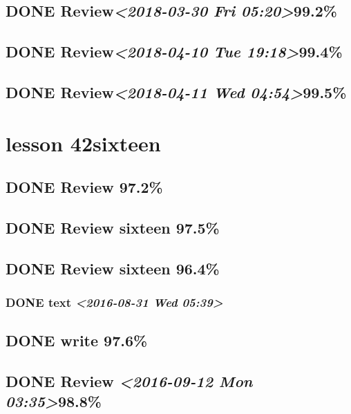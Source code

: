 \documentclass[11pt]{ctexart}
\begin{document}
\subsection{{\bfseries\sffamily DONE} Review\textit{<2018-03-30 Fri 05:20>}99.2\%}
\label{sec:org216b4f2}
\subsection{{\bfseries\sffamily DONE} Review\textit{<2018-04-10 Tue 19:18>}99.4\%}
\label{sec:org41d7b25}
\subsection{{\bfseries\sffamily DONE} Review\textit{<2018-04-11 Wed 04:54>}99.5\%}
\label{sec:orgc7917c3}
\section{lesson 42sixteen}
\label{sec:org973a858}
\subsection{{\bfseries\sffamily DONE} Review 97.2\%}
\label{sec:org3c01923}



\subsection{{\bfseries\sffamily DONE} Review sixteen 97.5\%}
\label{sec:org36be7a0}
\subsection{{\bfseries\sffamily DONE} Review sixteen 96.4\%}
\label{sec:orga836210}
\subsubsection{{\bfseries\sffamily DONE} text \textit{<2016-08-31 Wed 05:39>}}
\label{sec:org6805a4f}
\subsection{{\bfseries\sffamily DONE} write 97.6\%}
\label{sec:org479b3e1}

\subsection{{\bfseries\sffamily DONE} Review \textit{<2016-09-12 Mon 03:35>}98.8\%}
\label{sec:orgba8e37f}
\end{document}
